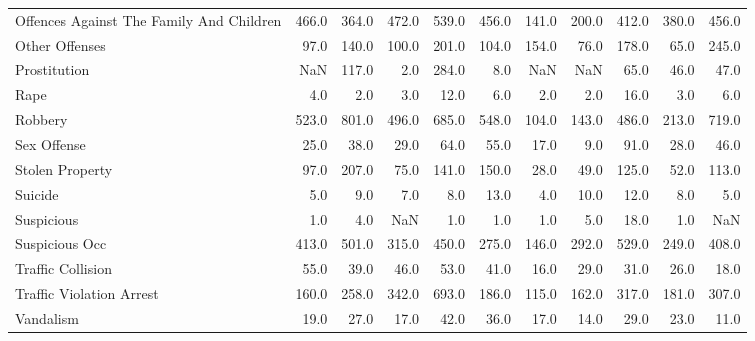 \documentclass[10pt,parskip=half,
toc=sectionentrywithdots,
bibliography=totocnumbered,
captions=tableheading,numbers=noendperiod]{scrartcl}
\begin{document}
\begin{table}[H]
\begin{adjustbox}{max width=\textwidth}
{\begin{tabular}{lrrrrrrrrrr}
Offences Against The Family And Children   &    466.0 &    364.0 &      472.0 &    539.0 &     456.0 &   141.0 &     200.0 &     412.0 &    380.0 &       456.0 \\
Other Offenses                             &     97.0 &    140.0 &      100.0 &    201.0 &     104.0 &   154.0 &      76.0 &     178.0 &     65.0 &       245.0 \\
Prostitution                               &      NaN &    117.0 &        2.0 &    284.0 &       8.0 &     NaN &       NaN &      65.0 &     46.0 &        47.0 \\
Rape                                       &      4.0 &      2.0 &        3.0 &     12.0 &       6.0 &     2.0 &       2.0 &      16.0 &      3.0 &         6.0 \\
Robbery                                    &    523.0 &    801.0 &      496.0 &    685.0 &     548.0 &   104.0 &     143.0 &     486.0 &    213.0 &       719.0 \\
Sex Offense                                &     25.0 &     38.0 &       29.0 &     64.0 &      55.0 &    17.0 &       9.0 &      91.0 &     28.0 &        46.0 \\
Stolen Property                            &     97.0 &    207.0 &       75.0 &    141.0 &     150.0 &    28.0 &      49.0 &     125.0 &     52.0 &       113.0 \\
Suicide                                    &      5.0 &      9.0 &        7.0 &      8.0 &      13.0 &     4.0 &      10.0 &      12.0 &      8.0 &         5.0 \\
Suspicious                                 &      1.0 &      4.0 &        NaN &      1.0 &       1.0 &     1.0 &       5.0 &      18.0 &      1.0 &         NaN \\
Suspicious Occ                             &    413.0 &    501.0 &      315.0 &    450.0 &     275.0 &   146.0 &     292.0 &     529.0 &    249.0 &       408.0 \\
Traffic Collision                          &     55.0 &     39.0 &       46.0 &     53.0 &      41.0 &    16.0 &      29.0 &      31.0 &     26.0 &        18.0 \\
Traffic Violation Arrest                   &    160.0 &    258.0 &      342.0 &    693.0 &     186.0 &   115.0 &     162.0 &     317.0 &    181.0 &       307.0 \\
Vandalism                                  &     19.0 &     27.0 &       17.0 &     42.0 &      36.0 &    17.0 &      14.0 &      29.0 &     23.0 &        11.0 \\

\end{tabular}}
\end{adjustbox}
\end{table}
\end{document}

